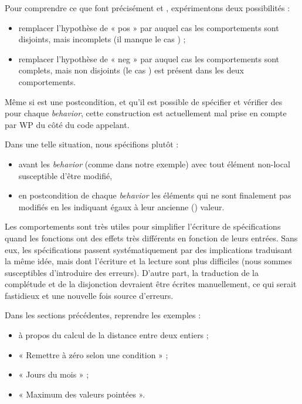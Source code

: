 Pour comprendre ce que font précisément  et ,
expérimentons deux possibilités :
\begin{itemize}
\item remplacer l'hypothèse de « pos » par  auquel cas les
comportements sont disjoints, mais incomplets (il manque le cas
) ;
\item remplacer l'hypothèse de « neg » par  auquel cas les
comportements sont complets, mais non disjoints (le cas ) est
présent dans les deux comportements.
\end{itemize}


\begin{Warning}
Même si  est une postcondition, et qu'il est possible de
spécifier et vérifier des  pour chaque \textit{behavior},
cette construction est actuellement mal prise en compte par WP du côté du code
appelant.

Dans une telle situation, nous spécifions plutôt :
\begin{itemize}
\item {} avant les \textit{behavior} (comme dans notre exemple) avec tout
élément non-local susceptible d'être modifié,
\item en postcondition de chaque \textit{behavior} les éléments qui ne sont finalement
pas modifiés en les indiquant égaux à leur ancienne () valeur.
\end{itemize}
\end{Warning}


Les comportements sont très utiles pour simplifier l'écriture de spécifications
quand les fonctions ont des effets très différents en fonction de leurs
entrées. Sans eux, les spécifications passent systématiquement par des
implications traduisant la même idée, mais dont l'écriture et la lecture sont
plus difficiles (nous sommes susceptibles d'introduire des erreurs).
D'autre part, la traduction de la complétude et de la disjonction devraient
être écrites manuellement, ce qui serait fastidieux et une nouvelle fois source
d'erreurs.







Dans les sections précédentes, reprendre les exemples :
\begin{itemize}
\item à propos du calcul de la distance entre deux entiers ;
\item « Remettre à zéro selon une condition » ;
\item « Jours du mois » ;
\item « Maximum des valeurs pointées ».
\end{itemize}


